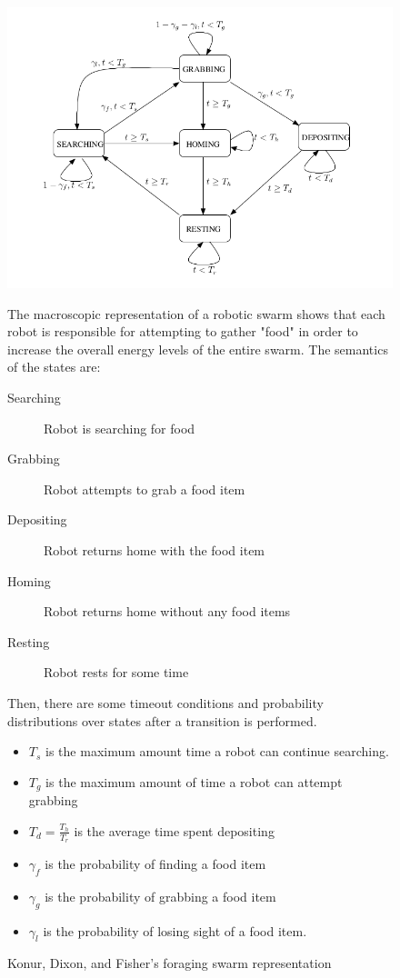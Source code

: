 \documentclass[11pt]{article}
\theoremstyle{definition}
\begin{document}
\begin{figure}
    \caption{Konur, Dixon, and Fisher's foraging swarm representation}
    \label{fig:foraging}
    \centering
    \includegraphics[width=\textwidth]{foraging.png}

    The macroscopic representation of a robotic swarm
    shows that each robot is responsible for attempting
    to gather "food" in order to increase the overall
    energy levels of the entire swarm. The semantics
    of the states are:

    \begin{description}
        \item[Searching] Robot is searching for food
        \item[Grabbing] Robot attempts to grab a food item
        \item[Depositing] Robot returns home with the food item
        \item[Homing] Robot returns home without any food items
        \item[Resting] Robot rests for some time
    \end{description}

    Then, there are some timeout conditions and probability
    distributions over states after a transition is performed.

    \begin{itemize}
        \item $ T_s $ is the maximum amount time a robot can continue searching.
        \item $ T_g $ is the maximum amount of time a robot can attempt
            grabbing
        \item $ T_d = \frac{T_h}{T_r} $ is the average time spent depositing
        \item $ \gamma_f $ is the probability of finding a food item
        \item $ \gamma_g $ is the probability of grabbing a food item
        \item $ \gamma_l $ is the probability of losing sight of a food
            item.
    \end{itemize}


\end{figure}
\end{document}
